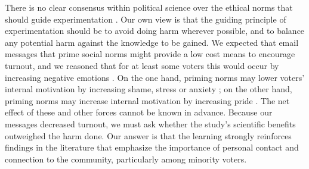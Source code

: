 \documentclass[12pt]{article}
\begin{document}
There is no clear consensus within political science over the ethical
norms that should guide experimentation
\citep[e.g.,][]{desposato2015ethics}. Our own view is that the guiding
principle of experimentation should be to avoid doing harm wherever
possible, and to balance any potential harm against the knowledge to
be gained. We expected that email messages that prime social norms
might provide a low cost means to encourage turnout, and we reasoned
that for at least some voters this would occur by increasing negative
emotions \citep{gerber2009}. On the one hand, priming norms may lower
voters’ internal motivation \citep{hassell2017} by increasing shame,
stress or anxiety \citep{panagopoulos2010, marcus2000}; on the other
hand, priming norms may increase internal motivation by increasing
pride \citep{panagopoulos2010}. The net effect of these and other
forces cannot be known in advance. Because our messages decreased
turnout, we must ask whether the study’s scientific benefits
outweighed the harm done. Our answer is that the learning strongly
reinforces findings in the literature that emphasize the importance of
personal contact and connection to the community, particularly among
minority voters.


\singlespacing  
\end{document}
